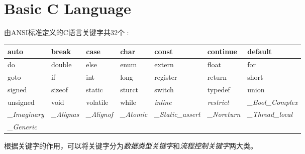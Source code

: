 \chapter{Basic C Language}\label{sec:basic_chapter}

由ANSI标准定义的C语言关键字共32个 :

\begin{table}
\begin{tabular}{|l|l|l|l|l|l|l|}
\hline
auto      & break  & case      & char    & const  	   & continue	  & default   \\
\hline
do        & double &  else     & enum    & extern      & float        & for       \\
\hline
goto      & if     & int       & long    & register    &  return      & short     \\
\hline
signed    & sizeof & static    & sturct  & switch      & typedef      & union     \\
\hline
unsigned  & void   & volatile  &  while  & \textit{inline}    & \textit{restrict}     & \textit{_Bool_Complex}   \\
\hline
\textit{_Imaginary} & \textit{_Alignas} & \textit{_Alignof}  & \textit{_Atomic}   & \textit{_Static_assert}  &  \textit{_Noreturn}  & \textit{_Thread_local}     \\
\hline
\textit{_Generic}  & & & & & &  \\
\hline
\end{tabular}
\end{table}

根据关键字的作用，可以将关键字分为\textit{数据类型关键字}和\textit{流程控制关键字}两大类。

